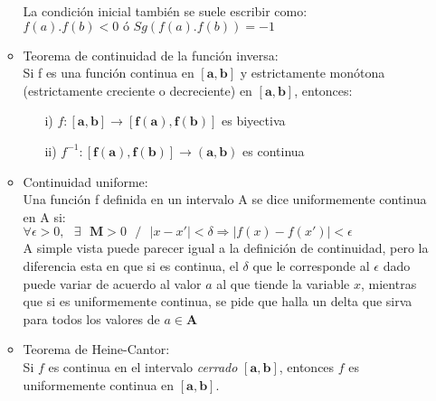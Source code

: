 \documentclass[a4paper,11pt]{report}
\begin{document}
\begin{itemize}
\begin{itemize}
La condición inicial también se suele escribir como: \\
$f(a).f(b)<0 \text{ ó } Sg(f(a).f(b))=-1$
\item Teorema de continuidad de la función inversa: \\
Si f es una función continua en  $\mathbf{[a,b]}$ y estrictamente monótona (estrictamente creciente o decreciente) en  $\mathbf{[a,b]}$, entonces:
\begin{itemize}
\item[i)] $f: \mathbf{[a,b]} \to  \mathbf{[f(a),f(b)]}$ es biyectiva
\item[ii)] $f^{-1}: \mathbf{[f(a),f(b)]} \to \mathbf{(a,b)}$ es continua
\end{itemize}
\item Continuidad uniforme: \\
Una función f definida en un intervalo A se dice uniformemente continua en A si: \\[5pt]
$\forall \epsilon > 0,\text{ }\exists \text{ }\mathbf{M} > 0\text{ } /\text{ } |x - x'|<\delta \Longrightarrow |f(x) - f(x')| < \epsilon$ \\[5pt]
A simple vista puede parecer igual a la definición de continuidad, pero la diferencia esta en que si es continua, el $\delta$ que le corresponde al $\epsilon$ dado puede variar de acuerdo al valor $a$ al que tiende la variable $x$, mientras que si es uniformemente continua, se pide que halla un delta que sirva para todos los valores de $a \in \mathbf{A}$
\item Teorema de Heine-Cantor: \\
Si $f$ es continua en el intervalo \emph{cerrado} $\mathbf{[a,b]}$, entonces $f$ es uniformemente continua en $\mathbf{[a,b]}$. \\

\newpage



\end{itemize}
\end{itemize}
\end{document}
